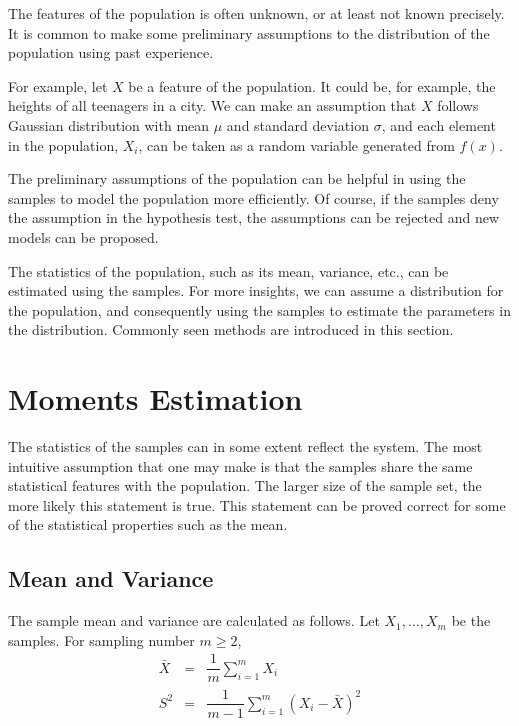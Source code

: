 The features of the population is often unknown, or at least not known precisely. It is common to make some preliminary assumptions to the distribution of the population using past experience.

For example, let $X$ be a feature of the population. It could be, for example, the heights of all teenagers in a city. We can make an assumption that $X$ follows Gaussian distribution with mean $\mu$ and standard deviation $\sigma$, and each element in the population, $X_i$, can be taken as a random variable generated from $f(x)$.

The preliminary assumptions of the population can be helpful in using the samples to model the population more efficiently. Of course, if the samples deny the assumption in the hypothesis test, the assumptions can be rejected and new models can be proposed.

The statistics of the population, such as its mean, variance, etc., can be estimated using the samples. For more insights, we can assume a distribution for the population, and consequently using the samples to estimate the parameters in the distribution. Commonly seen methods are introduced in this section.

\section{Moments Estimation}

The statistics of the samples can in some extent reflect the system. The most intuitive assumption that one may make is that the samples share the same statistical features with the population. The larger size of the sample set, the more likely this statement is true. This statement can be proved correct for some of the statistical properties such as the mean.

\subsection{Mean and Variance}

The sample mean and variance are calculated as follows. Let $X_1, \ldots, X_m$ be the samples. For sampling number $m\geq 2$,
\begin{eqnarray}
	\bar{X} &=& \dfrac{1}{m}\sum_{i=1}^{m}X_i \label{eq:sample_mean} \\
	S^2 &=& \dfrac{1}{m-1}\sum_{i=1}^{m}\left(X_i - \bar{X}\right)^2 \label{eq:sample_variance}
\end{eqnarray}

